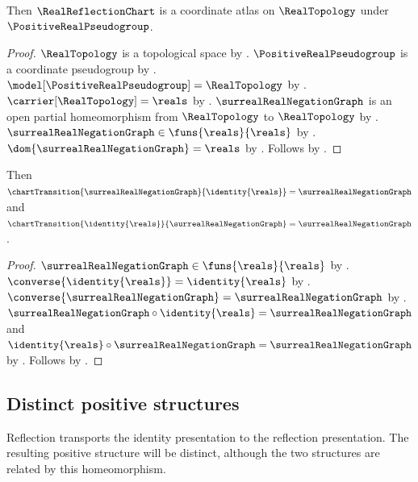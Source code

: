 \begin{classification}\label{real_reflection_positive_atlas}
    Then $\RealReflectionChart$ is a coordinate atlas on $\RealTopology$ under
        $\PositiveRealPseudogroup$.
\end{classification}
\begin{proof}
    $\RealTopology$ is a topological space by .
    $\PositiveRealPseudogroup$ is a coordinate pseudogroup by .
    $\model[\PositiveRealPseudogroup]=\RealTopology$ by
        .
    $\carrier[\RealTopology]=\reals$ by .
    $\surrealRealNegationGraph$ is an open partial homeomorphism from $\RealTopology$
        to $\RealTopology$ by .
    $\surrealRealNegationGraph\in\funs{\reals}{\reals}$ by
        .
    $\dom{\surrealRealNegationGraph}=\reals$ by .
    Follows by .
\end{proof}

\begin{theorem}\label{real_identity_reflection_transitions}
    Then $\chartTransition{\surrealRealNegationGraph}{\identity{\reals}}
        =\surrealRealNegationGraph$ and
        $\chartTransition{\identity{\reals}}{\surrealRealNegationGraph}
        =\surrealRealNegationGraph$.
\end{theorem}
\begin{proof}
    $\surrealRealNegationGraph\in\funs{\reals}{\reals}$ by
        .
    $\converse{\identity{\reals}}=\identity{\reals}$ by .
    $\converse{\surrealRealNegationGraph}=\surrealRealNegationGraph$ by
        .
    $\surrealRealNegationGraph\circ\identity{\reals}=\surrealRealNegationGraph$ and
        $\identity{\reals}\circ\surrealRealNegationGraph=\surrealRealNegationGraph$ by
        .
    Follows by .
\end{proof}

\subsection{Distinct positive structures}

Reflection transports the identity presentation to the reflection presentation.
The resulting positive structure will be distinct, although the two structures
are related by this homeomorphism.

